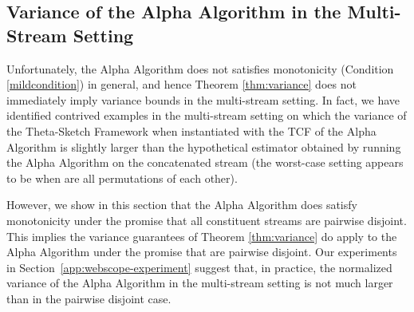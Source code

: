 \documentclass{article}
\newcommand{\edit}[1]{{#1}}
\begin{document}
\subsection{Variance of the Alpha Algorithm in the Multi-Stream Setting}
\label{multistream}
Unfortunately, the Alpha Algorithm does not satisfies monotonicity (Condition \ref{mildcondition}) in general,
and hence Theorem \ref{thm:variance} does not immediately imply variance bounds
in the multi-stream setting. In fact, we have identified contrived examples
in the multi-stream setting on which the variance of the Theta-Sketch Framework when instantiated with the TCF of the Alpha Algorithm
is slightly larger than the hypothetical estimator obtained by running the Alpha Algorithm on the concatenated stream  (the worst-case
setting appears to be when  are all permutations of each other). 

However, we show in this section that the Alpha Algorithm does satisfy monotonicity under the promise that all constituent streams are pairwise disjoint.
This implies the variance guarantees of Theorem \ref{thm:variance} do apply to the Alpha Algorithm under the promise that  are pairwise disjoint.
Our experiments in Section~\ref{app:webscope-experiment} suggest that, in practice, the \edit{normalized} variance of the Alpha Algorithm in the multi-stream setting is not much larger than in the pairwise disjoint case.
\end{document}
